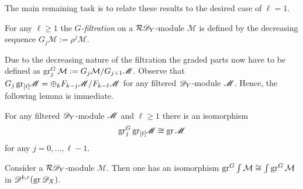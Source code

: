 The main remaining task is to relate these results to the desired case of $\ell = 1$.
\begin{definition}
  For any $\ell \geq 1$ the {\it $G$-filtration} on a $\mathcal{R}\mathscr{D}_Y$-module $\mathcal{M}$ is defined by the decreasing sequence $G_j \mathcal{M} := \rho^{j}\mathcal{M}$.
\end{definition}
Due to the decreasing nature of the filtration the graded parts now have to be defined as $\operatorname{gr}^G_j\mathcal{M}:= G_j\mathcal{M}/G_{j+1}\mathscr{M}$.
Observe that $G_j\operatorname{gr}_{[\ell]}\mkern-5mu\mathscr{M} = \oplus_k F_{k-j}\mathscr{M} /F_{k-\ell}\mathscr{M}$ for any filtered $\mathscr{D}_Y$-module $\mathscr{M}$.
Hence, the following lemma is immediate.
\begin{lemma}\label{lem: GradedGGradedLYieldsGraded}
  For any filtered $\mathscr{D}_Y$-module $\mathscr{M}$ and $\ell \geq 1$ there is an isomorphism
  $$\operatorname{gr}^G_j \operatorname{gr}_{[\ell]}\mkern-5mu \mathscr{M} \cong \operatorname{gr}\mathscr{M}$$
  for any $j= 0,\ldots, \ell - 1$.
\end{lemma}
\begin{lemma}\label{lem: grGCommutes}
  Consider a $\mathcal{R}\mathscr{D}_Y$-module $\mathcal{M}$.
  Then one has an isomorphism $\operatorname{gr}^G\int\mathcal{M} \cong \int\operatorname{gr}^G\mathcal{M}$ in $\mathscr{D}^{b,r}(\operatorname{gr}\mathscr{D}_X)$.
\end{lemma}
